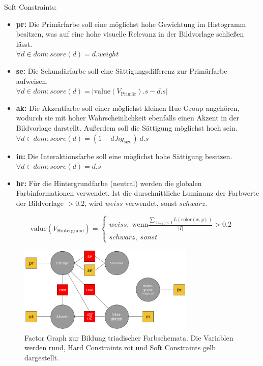 Soft Constraints:
\begin{itemize}
	\item \textbf{pr:} Die Primärfarbe soll eine möglichst hohe Gewichtung im Histogramm besitzen, was auf eine hohe visuelle Relevanz in der Bildvorlage schließen lässt.\\
		$\forall d \in dom: score(d) = d.weight$
	\item \textbf{se:} Die Sekundärfarbe soll eine Sättigungsdifferenz zur Primärfarbe aufweisen.\\
		$\forall d \in dom: score(d) = | \text{value}(V_\text{Primär}).s - d.s |$
	\item \textbf{ak:} Die Akzentfarbe soll einer möglichst kleinen Hue-Group angehören, wodurch sie mit hoher Wahrscheinlichkeit ebenfalls einen Akzent in der Bildvorlage darstellt. Außerdem soll die Sättigung möglichst hoch sein.\\
		$\forall d \in dom: score(d) = (1 - d.hg_\text{size})\ d.s$
	\item \textbf{in:} Die Interaktionsfarbe soll eine möglichst hohe Sättigung besitzen.\\
		$\forall d \in dom: score(d) = d.s$
	\item \textbf{hr:} Für die Hintergrundfarbe (neutral) werden die globalen Farbinformationen verwendet. Ist die durschnittliche Luminanz der Farbwerte der Bildvorlage $> 0.2$, wird $weiss$ verwendet, sonst $schwarz$.
\end{itemize}

\begin{equation*}
  \text{value}(V_\text{Hintergrund}) =
  \begin{cases}
  	weiss, \; \text{wenn} \frac{\sum_{(x, y) \in I} L(\text{color}(x, y))}{|I|} > 0.2\\
  	schwarz, \; sonst
  \end{cases}
\end{equation*}

\begin{figure}[h]
\centering
\includegraphics[width=0.75\textwidth]{img/scheme_triadic.png}
\caption{Factor Graph zur Bildung triadischer Farbschemata. Die Variablen werden rund, Hard Constraints rot und Soft Constraints gelb dargestellt.}
\label{fig:scheme_triadic}
\end{figure}

